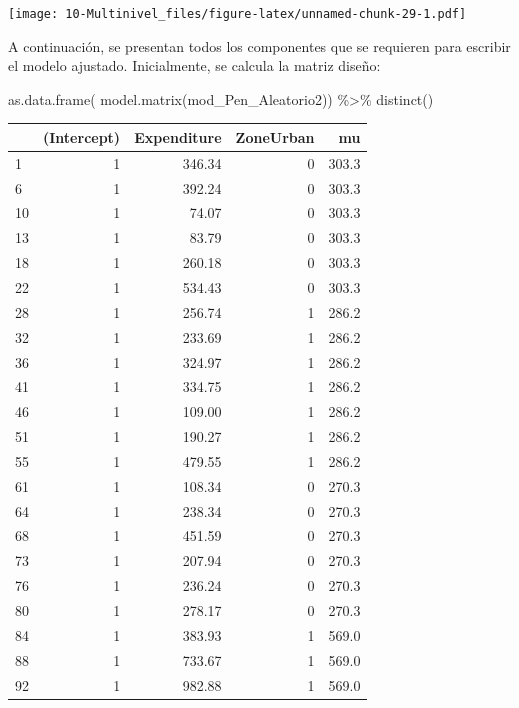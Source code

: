 \documentclass[
  12pt,
]{book}
\newenvironment{Shaded}{\begin{snugshade}}{\end{snugshade}}
\newcommand{\FunctionTok}[1]{\textcolor[rgb]{0.00,0.00,0.00}{#1}}
\newcommand{\NormalTok}[1]{#1}
\newcommand{\SpecialCharTok}[1]{\textcolor[rgb]{0.00,0.00,0.00}{#1}}
\begin{document}
\texttt{[image: 10-Multinivel\_files/figure-latex/unnamed-chunk-29-1.pdf]}

A continuación, se presentan todos los componentes que se requieren para escribir el modelo ajustado. Inicialmente, se calcula la matriz diseño:

\begin{Shaded}
\begin{Highlighting}[]
\FunctionTok{as.data.frame}\NormalTok{( }\FunctionTok{model.matrix}\NormalTok{(mod\_Pen\_Aleatorio2)) }\SpecialCharTok{\%\textgreater{}\%} 
  \FunctionTok{distinct}\NormalTok{()}
\end{Highlighting}
\end{Shaded}

\begin{tabular}{l|r|r|r|r}
\hline
  & (Intercept) & Expenditure & ZoneUrban & mu\\
\hline
1 & 1 & 346.34 & 0 & 303.3\\
\hline
6 & 1 & 392.24 & 0 & 303.3\\
\hline
10 & 1 & 74.07 & 0 & 303.3\\
\hline
13 & 1 & 83.79 & 0 & 303.3\\
\hline
18 & 1 & 260.18 & 0 & 303.3\\
\hline
22 & 1 & 534.43 & 0 & 303.3\\
\hline
28 & 1 & 256.74 & 1 & 286.2\\
\hline
32 & 1 & 233.69 & 1 & 286.2\\
\hline
36 & 1 & 324.97 & 1 & 286.2\\
\hline
41 & 1 & 334.75 & 1 & 286.2\\
\hline
46 & 1 & 109.00 & 1 & 286.2\\
\hline
51 & 1 & 190.27 & 1 & 286.2\\
\hline
55 & 1 & 479.55 & 1 & 286.2\\
\hline
61 & 1 & 108.34 & 0 & 270.3\\
\hline
64 & 1 & 238.34 & 0 & 270.3\\
\hline
68 & 1 & 451.59 & 0 & 270.3\\
\hline
73 & 1 & 207.94 & 0 & 270.3\\
\hline
76 & 1 & 236.24 & 0 & 270.3\\
\hline
80 & 1 & 278.17 & 0 & 270.3\\
\hline
84 & 1 & 383.93 & 1 & 569.0\\
\hline
88 & 1 & 733.67 & 1 & 569.0\\
\hline
92 & 1 & 982.88 & 1 & 569.0\\

\end{tabular}
\end{document}
